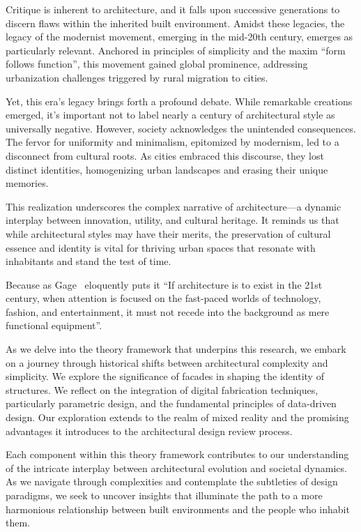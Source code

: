 Critique is inherent to architecture, and it falls upon successive generations to discern flaws within the inherited built environment.
Amidst these legacies, the legacy of the modernist movement, emerging in the mid-20th century, emerges as particularly relevant.
Anchored in principles of simplicity and the maxim ``form follows function'', this movement gained global prominence, addressing urbanization challenges triggered by rural migration to cities.

Yet, this era's legacy brings forth a profound debate.
While remarkable creations emerged, it's important not to label nearly a century of architectural style as universally negative.
However, society acknowledges the unintended consequences.
The fervor for uniformity and minimalism, epitomized by modernism, led to a disconnect from cultural roots.
As cities embraced this discourse, they lost distinct identities, homogenizing urban landscapes and erasing their unique memories.

This realization underscores the complex narrative of architecture—a dynamic interplay between innovation, utility, and cultural heritage.
It reminds us that while architectural styles may have their merits, the preservation of cultural essence and identity is vital for thriving urban spaces that resonate with inhabitants and stand the test of time.

 Because as Gage~\cite{Gage2015} eloquently puts it ``If architecture is to exist in the 21st century, when attention is focused on the fast-paced worlds of technology, fashion, and entertainment, it must not recede into the background as mere functional equipment''.

As we delve into the theory framework that underpins this research, we embark on a journey through historical shifts between architectural complexity and simplicity.
We explore the significance of facades in shaping the identity of structures.
We reflect on the integration of digital fabrication techniques, particularly parametric design, and the fundamental principles of data-driven design.
Our exploration extends to the realm of mixed reality and the promising advantages it introduces to the architectural design review process.

Each component within this theory framework contributes to our understanding of the intricate interplay between architectural evolution and societal dynamics.
As we navigate through complexities and contemplate the subtleties of design paradigms, we seek to uncover insights that illuminate the path to a more harmonious relationship between built environments and the people who inhabit them.

